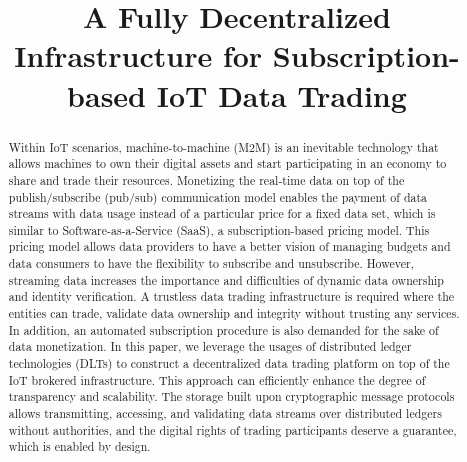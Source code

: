 \documentclass[conference]{IEEEtran}
\begin{document}
\title{A Fully Decentralized Infrastructure for Subscription-based IoT Data Trading}

\author{
\and
{}
\and
{}
}

\maketitle

\begin{abstract}
Within IoT scenarios, machine-to-machine (M2M) is an inevitable technology that allows machines to own their digital assets and start participating in an economy to share and trade their resources. Monetizing the real-time data on top of the publish/subscribe (pub/sub) communication model enables the payment of data streams with data usage instead of a particular price for a fixed data set, which is similar to Software-as-a-Service (SaaS), a subscription-based pricing model. This pricing model allows data providers to have a better vision of managing budgets and data consumers to have the flexibility to subscribe and unsubscribe. However, streaming data increases the importance and difficulties of dynamic data ownership and identity verification. A trustless data trading infrastructure is required where the entities can trade, validate data ownership and integrity without trusting any services. In addition, an automated subscription procedure is also demanded for the sake of data monetization. In this paper, we leverage the usages of distributed ledger technologies (DLTs) to construct a decentralized data trading platform on top of the IoT brokered infrastructure. This approach can efficiently enhance the degree of transparency and scalability. The storage built upon cryptographic message protocols allows transmitting, accessing, and validating data streams over distributed ledgers without authorities, and the digital rights of trading participants deserve a guarantee, which is enabled by design.
\end{abstract}
\end{document}
